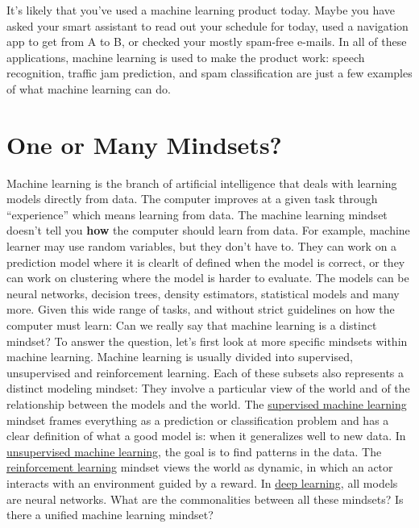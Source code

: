 \documentclass[
  10pt,
]{scrbook}
\begin{document}
It's likely that you've used a machine learning product today.
Maybe you have asked your smart assistant to read out your schedule for today, used a navigation app to get from A to B, or checked your mostly spam-free e-mails.
In all of these applications, machine learning is used to make the product work: speech recognition, traffic jam prediction, and spam classification are just a few examples of what machine learning can do.

\hypertarget{one-or-many-mindsets}{%
\section{One or Many Mindsets?}\label{one-or-many-mindsets}}

Machine learning is the branch of artificial intelligence that deals with learning models directly from data.
The computer improves at a given task through ``experience'' which means learning from data.
The machine learning mindset doesn't tell you \textbf{how} the computer should learn from data.
For example, machine learner may use random variables, but they don't have to.
They can work on a prediction model where it is clearlt of defined when the model is correct, or they can work on clustering where the model is harder to evaluate.
The models can be neural networks, decision trees, density estimators, statistical models and many more.
Given this wide range of tasks, and without strict guidelines on how the computer must learn: Can we really say that machine learning is a distinct mindset?
To answer the question, let's first look at more specific mindsets within machine learning.
Machine learning is usually divided into supervised, unsupervised and reinforcement learning.
Each of these subsets also represents a distinct modeling mindset: They involve a particular view of the world and of the relationship between the models and the world.
The \protect\hyperlink{supervised-ml}{supervised machine learning} mindset frames everything as a prediction or classification problem and has a clear definition of what a good model is: when it generalizes well to new data.
In \protect\hyperlink{unsupervised-ml}{unsupervised machine learning}, the goal is to find patterns in the data.
The \protect\hyperlink{reinforcement-learning}{reinforcement learning} mindset views the world as dynamic, in which an actor interacts with an environment guided by a reward.
In \protect\hyperlink{deep-learning}{deep learning}, all models are neural networks.
What are the commonalities between all these mindsets?
Is there a unified machine learning mindset?
\end{document}
